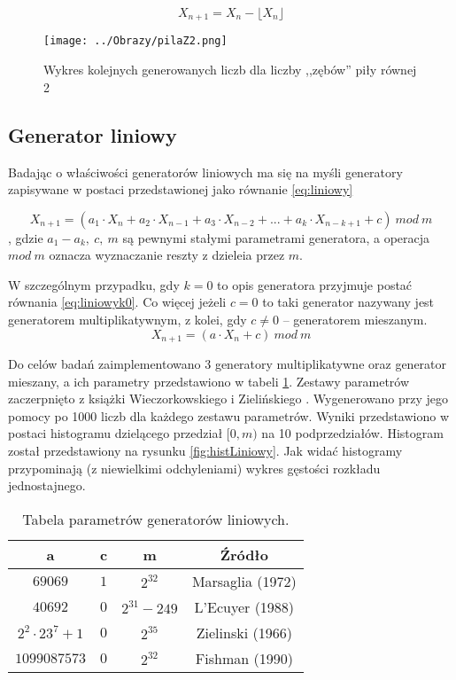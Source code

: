 \documentclass[12pt,a4paper]{article}
\begin{document}
\begin{equation}\label{eq:pilaZ1}
X_{n+1} = X_{n} - \lfloor X_{n}\rfloor
\end{equation}

\begin{figure}[!h]
\centering
\texttt{[image: ../Obrazy/pilaZ2.png]} 
\caption{Wykres kolejnych generowanych liczb dla liczby ,,zębów'' piły równej 2}
\label{fig:pilaZ2}
\end{figure}

\subsection{Generator liniowy}
Badając o właściwości generatorów liniowych ma się na myśli generatory zapisywane w postaci przedstawionej jako równanie \ref{eq:liniowy}

\begin{equation}\label{eq:liniowy}
X_{n+1} = (a_{1} \cdot X_{n} + a_{2} \cdot X_{n-1} + a_{3} \cdot X_{n-2} + ... + a_{k} \cdot X_{n-k+1} + c )\ mod\ m
\end{equation}
, gdzie $a_{1} - a_{k},\ c,\ m$ są pewnymi stałymi parametrami generatora, a operacja $mod\ m$ oznacza wyznaczanie reszty z dzieleia przez $m$.

W szczególnym przypadku, gdy $k=0$ to opis generatora przyjmuje postać równania \ref{eq:liniowyk0}.
Co więcej jeżeli $c = 0$ to taki generator nazywany jest generatorem multiplikatywnym, z kolei, gdy $c \neq 0$ -- generatorem mieszanym.
\begin{equation}\label{eq:liniowyk0}
X_{n+1} = (a \cdot X_{n}+ c )\ mod\ m
\end{equation}

Do celów badań zaimplementowano 3 generatory multiplikatywne oraz generator mieszany, a ich parametry przedstawiono w tabeli \ref{tab:parametry}.
Zestawy parametrów zaczerpnięto z książki Wieczorkowskiego i Zielińskiego \cite{generatory1997Wieczorkowski}.
Wygenerowano przy jego pomocy po 1000 liczb dla każdego zestawu parametrów. 
Wyniki przedstawiono w postaci histogramu dzielącego przedział $[0,m)$ na 10 podprzedziałów.
Histogram został przedstawiony na rysunku \ref{fig:histLiniowy}.
Jak widać histogramy przypominają (z niewielkimi odchyleniami) wykres gęstości rozkładu jednostajnego.


\begin{table}[H]
\begin{center}
\begin{tabular}{|c|c|c|c|}
\hline
\textbf{a} & \textbf{c} & \textbf{m} & \textbf{Źródło} \\
\hline
$69069$ & $1$ & $2^{32}$ & Marsaglia (1972) \\
\hline
$40692$ & $0$ & $2^{31}-249$ & L'Ecuyer (1988) \\
\hline
$2^{2} \cdot 23^{7} + 1$ & $0$ & $2^{35}$ & Zielinski (1966) \\
\hline
$1099087573$ & $0$ & $2^{32}$ & Fishman (1990) \\
\hline
\end{tabular}
\caption{Tabela parametrów generatorów liniowych.}
\label{tab:parametry}
\end{center}
\end{table}
\end{document}
